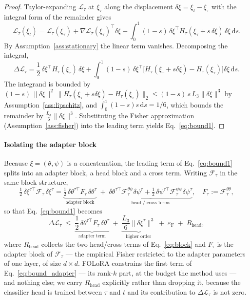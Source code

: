 \begin{proof}
Taylor-expanding $\mathcal{L}_\tau$ at $\xi_\tau$ along the displacement
$\delta\xi=\xi_t-\xi_\tau$ with the integral form of the remainder gives
\begin{equation}
\mathcal{L}_\tau(\xi_t)
= \mathcal{L}_\tau(\xi_\tau)
+ \nabla\mathcal{L}_\tau(\xi_\tau)^{\!\top}\delta\xi
+ \int_0^1 (1-s)\,\delta\xi^{\!\top} H_\tau(\xi_\tau+s\,\delta\xi)\,\delta\xi \,\mathrm{d}s .
\end{equation}
By Assumption~\ref{ass:stationary} the linear term vanishes. Decomposing the integral,
\begin{equation}
\Delta\mathcal{L}_\tau
= \frac12\,\delta\xi^{\!\top}H_\tau(\xi_\tau)\,\delta\xi
+ \int_0^1 (1-s)\,\delta\xi^{\!\top}\big[H_\tau(\xi_\tau{+}s\delta\xi)-H_\tau(\xi_\tau)\big]\delta\xi\,\mathrm{d}s .
\end{equation}
The integrand is bounded by
$(1-s)\,\|\delta\xi\|^2\,\|H_\tau(\xi_\tau{+}s\delta\xi)-H_\tau(\xi_\tau)\|_2
\le (1-s)\,s\,L_3\|\delta\xi\|^3$ by Assumption~\ref{ass:lipschitz}, and
$\int_0^1 (1-s)s\,\mathrm{d}s = 1/6$, which bounds the remainder by
$\tfrac{L_3}{6}\|\delta\xi\|^3$. Substituting the Fisher approximation
(Assumption~\ref{ass:fisher}) into the leading term yields
Eq.~\eqref{eq:bound1}.
\end{proof}

\paragraph{Isolating the adapter block}
Because $\xi=(\theta,\psi)$ is a concatenation, the leading term of
Eq.~\eqref{eq:bound1} splits into an adapter block, a head block and a cross term. Writing
$\mathcal{F}_\tau$ in the same block structure,
\begin{equation}
\tfrac12\,\delta\xi^{\tau\top}\mathcal{F}_\tau\,\delta\xi^{\tau}
=
\underbrace{\tfrac12\,\delta\theta^{\tau\top} F_\tau\,\delta\theta^{\tau}}_{\text{adapter block}}
\;+\;
\underbrace{\delta\theta^{\tau\top}\mathcal{F}_\tau^{\theta\psi}\delta\psi^{\tau}
+\tfrac12\,\delta\psi^{\tau\top}\mathcal{F}_\tau^{\psi\psi}\delta\psi^{\tau}}_{\text{head / cross terms}},
\quad
F_\tau := \mathcal{F}_\tau^{\theta\theta},
\label{eq:block}
\end{equation}
so that Eq.~\eqref{eq:bound1} becomes
\begin{equation}
\Delta\mathcal{L}_\tau
\;\le\;
\underbrace{\frac12\,\delta\theta^{\tau\top} F_\tau\,\delta\theta^{\tau}}_{\text{adapter term}}
\;+\;\underbrace{\frac{L_3}{6}\big\|\delta\xi^{\tau}\big\|^{3}}_{\text{higher order}}
\;+\;\varepsilon_{\mathrm{F}}
\;+\;R_{\text{head}},
\label{eq:bound_adapter}
\end{equation}
where $R_{\text{head}}$ collects the two head/cross terms of Eq.~\eqref{eq:block} and
$F_\tau$ is the adapter block of $\mathcal{F}_\tau$ --- the empirical Fisher restricted to
the adapter parameters of one layer, of size $d\times d$. FOLoRA constrains the first term
of Eq.~\eqref{eq:bound_adapter} --- its rank-$k$ part, at the budget the method uses ---
and nothing else; we carry $R_{\text{head}}$ explicitly
rather than dropping it, because the classifier head is trained between $\tau$ and $t$ and
its contribution to $\Delta\mathcal{L}_\tau$ is not zero.

